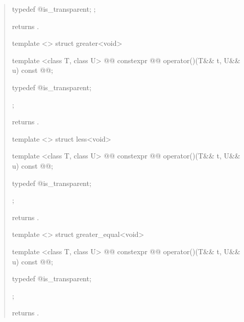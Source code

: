 \begin{quote}
\begin{itemdecl}
{  typedef @\unspec@ is_transparent;
};
\end{itemdecl}

\begin{itemdescr}
\pnum
{} returns .
\end{itemdescr}

%
\begin{itemdecl}
template <> struct greater<void> {
  template <class T, class U>
    @@
  constexpr @@ operator()(T&& t, U&& u) const
    @@;

  typedef @\unspec@ is_transparent;
};
\end{itemdecl}

\begin{itemdescr}
\pnum
{} returns .
\end{itemdescr}

%
\begin{itemdecl}
template <> struct less<void> {
  template <class T, class U>
    @@
  constexpr @@ operator()(T&& t, U&& u) const
    @@;

  typedef @\unspec@ is_transparent;
};
\end{itemdecl}

\begin{itemdescr}
\pnum
{} returns .
\end{itemdescr}

%
\begin{itemdecl}
template <> struct greater_equal<void> {
  template <class T, class U>
    @@
  constexpr @@ operator()(T&& t, U&& u) const
    @@;

  typedef @\unspec@ is_transparent;
};
\end{itemdecl}

\begin{itemdescr}
\pnum
{} returns .
\end{itemdescr}


\end{quote}
